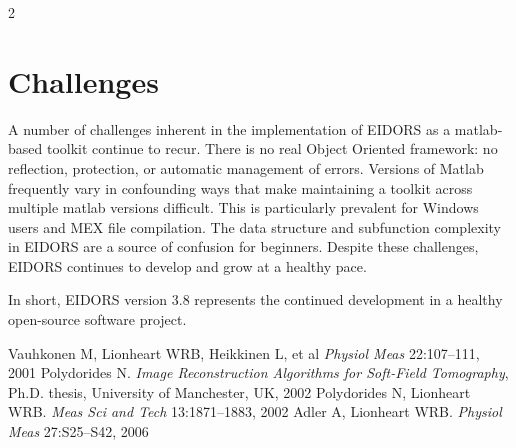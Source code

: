 \documentclass[10pt,a4paper]{article}
\renewenvironment{thebibliography}[1]{%
    \begin{oldthebibliography}{#1}%
      \setlength{\parskip}{0ex}%
      \setlength{\itemsep}{0ex}%
  }%
  {%
    \end{oldthebibliography}%
  }
\begin{document}
\begin{multicols}{2}
\section{Challenges}
A number of challenges inherent in the implementation of EIDORS as a matlab-based toolkit continue to recur.
There is no real Object Oriented framework: no reflection, protection, or
  automatic management of errors.
Versions of Matlab frequently vary in confounding ways that make
  maintaining a toolkit across multiple matlab versions difficult. This is
  particularly prevalent for Windows users and MEX file compilation.
The data structure and subfunction complexity in EIDORS are a
  source of confusion for beginners.
Despite these challenges, EIDORS continues to develop and grow at a healthy pace.

In short, EIDORS version 3.8 represents the continued development
in a healthy open-source software project.

\footnotesize
\begin{thebibliography}{}
   Vauhkonen M, Lionheart WRB, Heikkinen L, et al
   {\em  Physiol Meas} 22:107--111, 2001
   Polydorides N.
 {\em Image Reconstruction Algorithms for Soft-Field Tomography}, Ph.D. thesis, University of Manchester, UK, 2002
   Polydorides N, Lionheart WRB.
   {\em Meas Sci and Tech} 13:1871--1883, 2002
Adler A, Lionheart WRB. {\em Physiol Meas} 27:S25--S42, 2006
\end{thebibliography}
\end{multicols}
\end{document}

